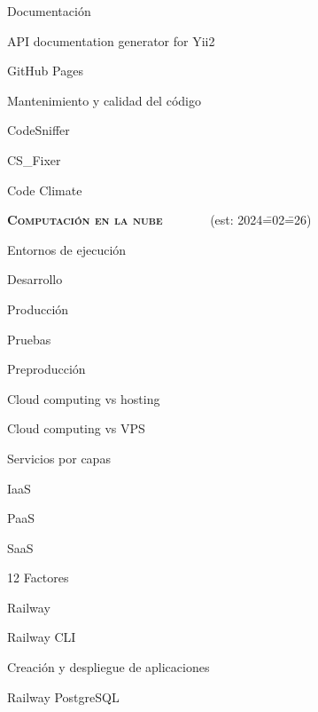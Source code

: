 \begin{longenum}
\begin{longenum}
\begin{longenum}
        \end{longenum}
        \item Documentación
        \begin{longenum}
            \item API documentation generator for Yii2
            \item GitHub Pages
        \end{longenum}
        \item Mantenimiento y calidad del código
        \begin{longenum}
            \item CodeSniffer
            \item CS\_Fixer
            \item Code Climate
        \end{longenum}
    \end{longenum}
    \item \textbf{\textsc{Computación en la nube}} \ \ \ \ \ \ \ (est: 2024\==02\==26)
    \begin{longenum}
        \item Entornos de ejecución
        \begin{longenum}
            \item Desarrollo
            \item Producción
            \item Pruebas
            \item Preproducción
        \end{longenum}
        \item Cloud computing vs hosting
        \item Cloud computing vs VPS
        \item Servicios por capas
        \begin{longenum}
            \item IaaS
            \item PaaS
            \item SaaS
        \end{longenum}
        \item 12 Factores
        \item Railway
        \begin{longenum}
            \item Railway CLI
            \item Creación y despliegue de aplicaciones
            \item Railway PostgreSQL

\end{longenum}
\end{longenum}
\end{longenum}
